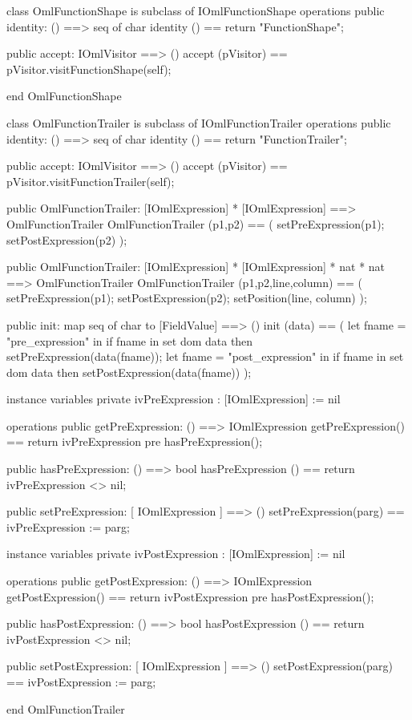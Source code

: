 \begin{vdm_al}
class OmlFunctionShape is subclass of IOmlFunctionShape
operations
  public identity: () ==> seq of char
  identity () == return "FunctionShape";

  public accept: IOmlVisitor ==> ()
  accept (pVisitor) == pVisitor.visitFunctionShape(self);

end OmlFunctionShape
\end{vdm_al}
\begin{vdm_al}
class OmlFunctionTrailer is subclass of IOmlFunctionTrailer
operations
  public identity: () ==> seq of char
  identity () == return "FunctionTrailer";

  public accept: IOmlVisitor ==> ()
  accept (pVisitor) == pVisitor.visitFunctionTrailer(self);

  public OmlFunctionTrailer:
    [IOmlExpression] *
    [IOmlExpression] ==> OmlFunctionTrailer
  OmlFunctionTrailer (p1,p2) == 
    ( setPreExpression(p1);
      setPostExpression(p2) );

  public OmlFunctionTrailer:
    [IOmlExpression] *
    [IOmlExpression] *
    nat *
    nat ==> OmlFunctionTrailer
  OmlFunctionTrailer (p1,p2,line,column) == 
    ( setPreExpression(p1);
      setPostExpression(p2);
      setPosition(line, column) );

  public init: map seq of char to [FieldValue] ==> ()
  init (data) ==
    ( let fname = "pre_expression" in
        if fname in set dom data
        then setPreExpression(data(fname));
      let fname = "post_expression" in
        if fname in set dom data
        then setPostExpression(data(fname)) );

instance variables
  private ivPreExpression : [IOmlExpression] := nil

operations
  public getPreExpression: () ==> IOmlExpression
  getPreExpression() == return ivPreExpression
    pre hasPreExpression();

  public hasPreExpression: () ==> bool
  hasPreExpression () == return ivPreExpression <> nil;

  public setPreExpression: [ IOmlExpression ] ==> ()
  setPreExpression(parg) == ivPreExpression := parg;

instance variables
  private ivPostExpression : [IOmlExpression] := nil

operations
  public getPostExpression: () ==> IOmlExpression
  getPostExpression() == return ivPostExpression
    pre hasPostExpression();

  public hasPostExpression: () ==> bool
  hasPostExpression () == return ivPostExpression <> nil;

  public setPostExpression: [ IOmlExpression ] ==> ()
  setPostExpression(parg) == ivPostExpression := parg;

end OmlFunctionTrailer
\end{vdm_al}

